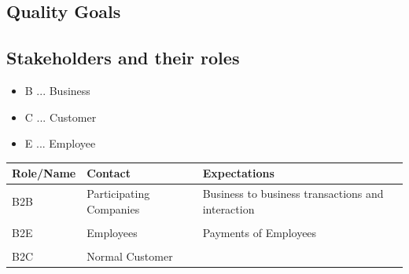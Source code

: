 \subsection{Quality Goals}\label{_quality_goals}

\subsection{Stakeholders and their roles}\label{_stakeholders}

\begin{itemize}
	\item B ... Business
	\item C ... Customer
	\item E ... Employee	
\end{itemize}

\begin{longtable}[]{@{}lll@{}}
\toprule
\begin{minipage}[b]{0.18\columnwidth}\raggedright\strut
Role/Name\strut
\end{minipage} & \begin{minipage}[b]{0.37\columnwidth}\raggedright\strut
Contact\strut
\end{minipage} & \begin{minipage}[b]{0.37\columnwidth}\raggedright\strut
Expectations\strut
\end{minipage}\tabularnewline
\midrule
\endhead
\begin{minipage}[t]{0.18\columnwidth}B2B \end{minipage} &
\begin{minipage}[t]{0.37\columnwidth}Participating Companies \end{minipage} &
\begin{minipage}[t]{0.37\columnwidth}Business to business transactions and interaction\end{minipage}
\tabularnewline
\tabularnewline
\begin{minipage}[t]{0.18\columnwidth}B2E \end{minipage} &
\begin{minipage}[t]{0.37\columnwidth}Employees \end{minipage} &
\begin{minipage}[t]{0.37\columnwidth}Payments of Employees\end{minipage}
\tabularnewline
\tabularnewline
\begin{minipage}[t]{0.18\columnwidth}B2C \end{minipage} &
\begin{minipage}[t]{0.37\columnwidth}Normal Customer \end{minipage} &

\end{longtable}
